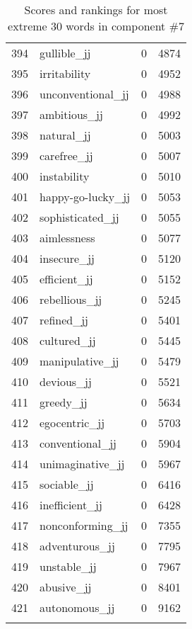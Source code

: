 \begin{longtable}[!htbp]{| rlr@{.}l |}
    394 & gullible\_jj & 0 & 4874 \\
    395 & irritability & 0 & 4952 \\
    396 & unconventional\_jj & 0 & 4988 \\
    397 & ambitious\_jj & 0 & 4992 \\
    398 & natural\_jj & 0 & 5003 \\
    399 & carefree\_jj & 0 & 5007 \\
    400 & instability & 0 & 5010 \\
    401 & happy-go-lucky\_jj & 0 & 5053 \\
    402 & sophisticated\_jj & 0 & 5055 \\
    403 & aimlessness & 0 & 5077 \\
    404 & insecure\_jj & 0 & 5120 \\
    405 & efficient\_jj & 0 & 5152 \\
    406 & rebellious\_jj & 0 & 5245 \\
    407 & refined\_jj & 0 & 5401 \\
    408 & cultured\_jj & 0 & 5445 \\
    409 & manipulative\_jj & 0 & 5479 \\
    410 & devious\_jj & 0 & 5521 \\
    411 & greedy\_jj & 0 & 5634 \\
    412 & egocentric\_jj & 0 & 5703 \\
    413 & conventional\_jj & 0 & 5904 \\
    414 & unimaginative\_jj & 0 & 5967 \\
    415 & sociable\_jj & 0 & 6416 \\
    416 & inefficient\_jj & 0 & 6428 \\
    417 & nonconforming\_jj & 0 & 7355 \\
    418 & adventurous\_jj & 0 & 7795 \\
    419 & unstable\_jj & 0 & 7967 \\
    420 & abusive\_jj & 0 & 8401 \\
    421 & autonomous\_jj & 0 & 9162 \\
    \hline
    \caption{Scores and rankings for most extreme 30 words in component \#7} \\
\end{longtable}
